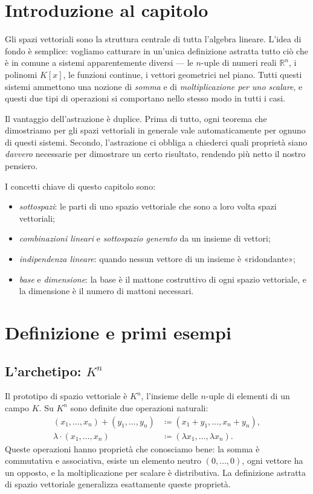 \documentclass[11pt, a4paper]{book}
\theoremstyle{definition}
\theoremstyle{plain}
\theoremstyle{remark}
\newcommand{\R}{\mathbb{R}}
\begin{document}
\section*{Introduzione al capitolo}

Gli spazi vettoriali sono la struttura centrale di tutta l'algebra lineare. L'idea di fondo è semplice: vogliamo catturare in un'unica definizione astratta tutto ciò che è in comune a sistemi apparentemente diversi — le $n$-uple di numeri reali $\R^n$, i polinomi $K[x]$, le funzioni continue, i vettori geometrici nel piano. Tutti questi sistemi ammettono una nozione di \emph{somma} e di \emph{moltiplicazione per uno scalare}, e questi due tipi di operazioni si comportano nello stesso modo in tutti i casi.

Il vantaggio dell'astrazione è duplice. Prima di tutto, ogni teorema che dimostriamo per gli spazi vettoriali in generale vale automaticamente per ognuno di questi sistemi. Secondo, l'astrazione ci obbliga a chiederci quali proprietà siano \emph{davvero} necessarie per dimostrare un certo risultato, rendendo più netto il nostro pensiero.

I concetti chiave di questo capitolo sono:
\begin{itemize}
  \item \emph{sottospazi}: le parti di uno spazio vettoriale che sono a loro volta spazi vettoriali;
  \item \emph{combinazioni lineari} e \emph{sottospazio generato} da un insieme di vettori;
  \item \emph{indipendenza lineare}: quando nessun vettore di un insieme è «ridondante»;
  \item \emph{base} e \emph{dimensione}: la base è il mattone costruttivo di ogni spazio vettoriale, e la dimensione è il numero di mattoni necessari.
\end{itemize}

\section{Definizione e primi esempi}

\subsection{L'archetipo: $K^n$}

Il prototipo di spazio vettoriale è $K^n$, l'insieme delle $n$-uple di elementi di un campo $K$. Su $K^n$ sono definite due operazioni naturali:
\begin{align}
  (x_1,\ldots,x_n) + (y_1,\ldots,y_n) &\coloneqq (x_1+y_1,\ldots,x_n+y_n), \label{eq:sumKn}\\
  \lambda \cdot (x_1,\ldots,x_n) &\coloneqq (\lambda x_1,\ldots,\lambda x_n). \label{eq:scalarKn}
\end{align}
Queste operazioni hanno proprietà che conosciamo bene: la somma è commutativa e associativa, esiste un elemento neutro $(0,\ldots,0)$, ogni vettore ha un opposto, e la moltiplicazione per scalare è distributiva. La definizione astratta di spazio vettoriale generalizza esattamente queste proprietà.
\end{document}
